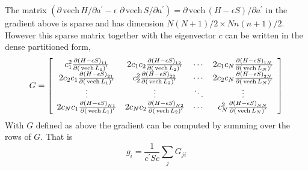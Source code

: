 \documentclass[12pt,thmsa,suthesis,verbatim]{report}
\begin{document}
The matrix $\left( \partial \,\mathrm{vech}\,H/\partial a^{\prime }-\epsilon
\,\,\partial \,\mathrm{vech}\,S/\partial a^{\prime }\right) =\partial \,%
\mathrm{vech}\,\left( H-\epsilon S\right) /\partial a^{\prime }$ in the
gradient above is sparse and has dimension $N\left( N+1\right) /2\times
Nn\left( n+1\right) /2$. However this sparse matrix together with the
eigenvector $c$ can be written in the dense partitioned form, 
\begin{equation}
G=\left[ 
\begin{array}{cccc}
c_1^2\frac{\partial \left( H-\epsilon S\right) _{11}}{\partial \left( \,%
\mathrm{vech}\,L_1\right) ^{\prime }} & 2c_1c_2\frac{\partial \left(
H-\epsilon S\right) _{12}}{\partial \left( \,\mathrm{vech}\,L_2\right)
^{\prime }} & \cdots & 2c_1c_N\frac{\partial \left( H-\epsilon S\right) _{1N}%
}{\partial \left( \,\mathrm{vech}\,L_N\right) ^{\prime }} \\ 
2c_2c_1\frac{\partial \left( H-\epsilon S\right) _{21}}{\partial \left( \,%
\mathrm{vech}\,L_1\right) ^{\prime }} & c_2^2\frac{\partial \left(
H-\epsilon S\right) _{22}}{\partial \left( \,\mathrm{vech}\,L_2\right)
^{\prime }} & \cdots & 2c_2c_N\frac{\partial \left( H-\epsilon S\right) _{2N}%
}{\partial \left( \,\mathrm{vech}\,L_N\right) ^{\prime }} \\ 
\vdots & \vdots & \ddots & \vdots \\ 
2c_Nc_1\frac{\partial \left( H-\epsilon S\right) _{N1}}{\partial \left( \,%
\mathrm{vech}\,L_1\right) ^{\prime }} & 2c_Nc_2\frac{\partial \left(
H-\epsilon S\right) _{N2}}{\partial \left( \,\mathrm{vech}\,L_2\right)
^{\prime }} & \cdots & c_N^2\frac{\partial \left( H-\epsilon S\right) _{NN}}{%
\partial \left( \,\mathrm{vech}\,L_N\right) ^{\prime }}
\end{array}
\right]
\end{equation}
With $G$ defined as above the gradient can be computed by summing over the
rows of $G$. That is 
\[
g_i=\frac 1{c^{\prime }Sc}\sum_jG_{ji} 
\]
\end{document}
